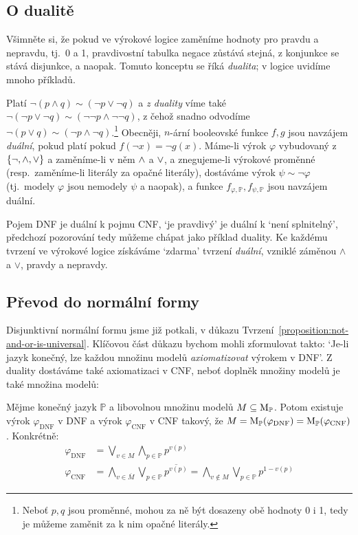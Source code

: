 \subsection{O dualitě}

Všimněte si, že pokud ve výrokové logice zaměníme hodnoty pro pravdu a nepravdu, tj.\ 0 a 1, pravdivostní tabulka negace zůstává stejná, z konjunkce se stává disjunkce, a naopak. Tomuto konceptu se říká \emph{dualita}; v logice uvidíme mnoho příkladů. 

Platí $\neg(p\land q)\sim (\neg p\lor \neg q)$ a \emph{z duality} víme také $\neg(\neg p\lor \neg q)\sim (\neg \neg p\land \neg \neg q)$, z čehož snadno odvodíme $\neg(p\lor q)\sim (\neg p\land \neg q)$.\footnote{Neboť $p,q$ jsou proměnné, mohou za ně být dosazeny obě hodnoty 0 i 1, tedy je můžeme zaměnit za k nim opačné literály.} Obecněji, $n$-ární booleovské funkce $f,g$ jsou navzájem \emph{duální}, pokud platí pokud $f(\neg x)=\neg g(x)$. Máme-li výrok $\varphi$ vybudovaný z $\{\neg,{\land},{\lor}\}$ a zaměníme-li v něm ${\land}$ a ${\lor}$, a znegujeme-li výrokové proměnné (resp.\ zaměníme-li literály za opačné literály), dostáváme výrok $\psi\sim\neg\varphi$ (tj.\ modely $\varphi$ jsou nemodely $\psi$ a naopak), a funkce $f_{\varphi,\mathbb P},f_{\psi,\mathbb P}$ jsou navzájem duální.

Pojem DNF je duální k pojmu CNF, `je pravdivý' je duální k `není splnitelný', předchozí pozorování tedy můžeme chápat jako příklad duality. Ke každému tvrzení ve výrokové logice získáváme `zdarma' tvrzení \emph{duální}, vzniklé záměnou $\land$ a $\lor$, pravdy a nepravdy.


\subsection{Převod do normální formy}\label{subsection:convert-to-normal-form}

Disjunktivní normální formu jsme již potkali, v důkazu Tvrzení~\ref{proposition:not-and-or-is-universal}. Klíčovou část důkazu bychom mohli zformulovat takto: `Je-li jazyk konečný, lze každou množinu modelů \emph{axiomatizovat} výrokem v DNF'. Z duality dostáváme také axiomatizaci v CNF, neboť doplněk množiny modelů je také množina modelů:

\begin{proposition} \label{proposition:axiomatize-in-DNF-CNF}
    Mějme konečný jazyk $\mathbb P$ a libovolnou množinu modelů $M\subseteq\operatorname{M}_\mathbb P$. Potom existuje výrok $\varphi_{\mathrm{DNF}}$ v DNF a výrok $\varphi_{\mathrm{CNF}}$ v CNF takový, že $M=\operatorname{M}_\mathbb P(\varphi_{\mathrm{DNF}})=\operatorname{M}_\mathbb P(\varphi_{\mathrm{CNF}})$. Konkrétně:
\begin{align*}
    \varphi_{\mathrm{\mathrm{DNF}}} &= \bigvee_{v\in M}\bigwedge_{p\in\mathbb P}p^{v(p)}\\
    \varphi_{\mathrm{CNF}} &= \bigwedge_{v\in \overline{M}}\bigvee_{p\in\mathbb P}\overline{p^{v(p)}}=\bigwedge_{v\notin M}\bigvee_{p\in\mathbb P}p^{1-v(p)}
\end{align*}
\end{proposition}


